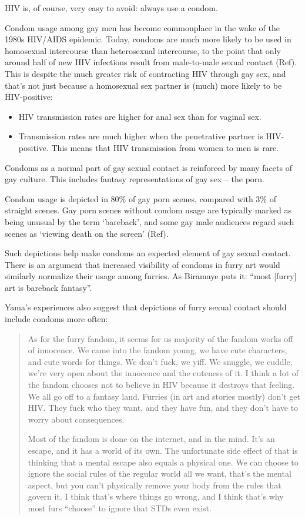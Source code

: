 HIV is, of course, very easy to avoid: always use a condom.

Condom usage among gay men has become commonplace in the wake of the 1980s HIV/AIDS epidemic. Today, condoms are much more likely to be used in homosexual intercourse than heterosexual intercourse, to the point that only around half of new HIV infections result from male-to-male sexual contact (Ref). This is despite the much greater risk of contracting HIV through gay sex, and that's not just because a homosexual sex partner is (much) more likely to be HIV-positive:

\begin{itemize}
  \item HIV transmission rates are higher for anal sex than for vaginal sex.
  \item Transmission rates are much higher when the penetrative partner is HIV-positive. This means that HIV transmission from women to men is rare.
\end{itemize}

Condoms as a normal part of gay sexual contact is reinforced by many facets of gay culture. This includes fantasy representations of gay sex – the porn.

Condom usage is depicted in 80\% of gay porn scenes, compared with 3\% of straight scenes. Gay porn scenes without condom usage are typically marked as being unusual by the term ‘bareback', and some gay male audiences regard such scenes as ‘viewing death on the screen' (Ref).

Such depictions help make condoms an expected element of gay sexual contact. There is an argument that increased visibility of condoms in furry art would similarly normalize their usage among furries. As Biramaye puts it: ``most [furry] art is bareback fantasy''.

Yama's experiences also suggest that depictions of furry sexual contact should include condoms more often:

\begin{quotation}
  As for the furry fandom, it seems for us majority of the fandom works off of innocence. We came into the fandom young, we have cute characters, and cute words for things. We don't fuck, we yiff. We snuggle, we cuddle, we're very open about the innocence and the cuteness of it. I think a lot of the fandom chooses not to believe in HIV because it destroys that feeling. We all go off to a fantasy land. Furries (in art and stories mostly) don't get HIV. They fuck who they want, and they have fun, and they don't have to worry about consequences.

  Most of the fandom is done on the internet, and in the mind. It's an escape, and it has a world of its own. The unfortunate side effect of that is thinking that a mental escape also equals a physical one. We can choose to ignore the social rules of the regular world all we want, that's the mental aspect, but you can't physically remove your body from the rules that govern it. I think that's where things go wrong, and I think that's why most furs ``choose'' to ignore that STDs even exist.
\end{quotation}

